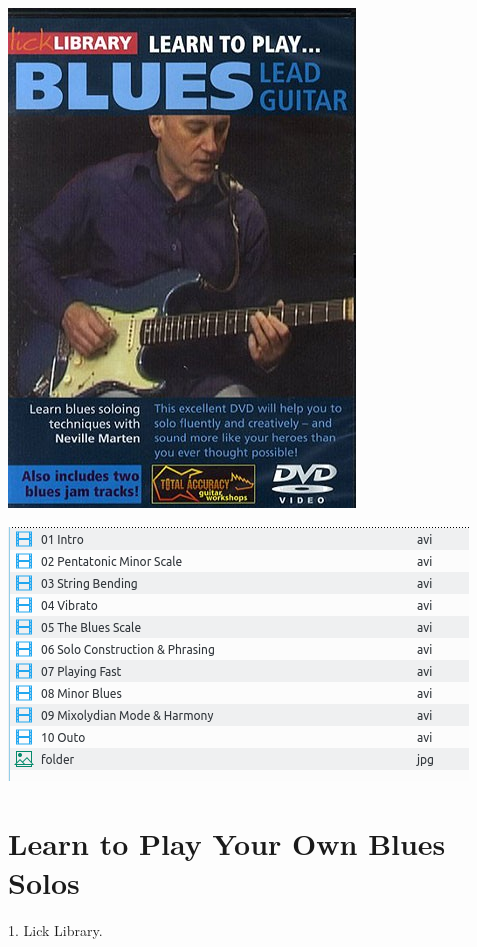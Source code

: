 \documentclass[a4paper]{book}
\begin{document}
\begin{center}
\includegraphics[width=9.208cm,height=13.229cm]{lebluessupportsmethodes-img131.jpg}
\end{center}





\begin{center}
\includegraphics[width=12.196cm,height=6.719cm]{lebluessupportsmethodes-img132.png}
\end{center}





\clearpage


\section[Learn to Play Your Own Blues Solos]{Learn to Play Your Own
Blues Solos}
\hypertarget{RefHeadingToc182973218262}{}1. Lick Library.
\end{document}
